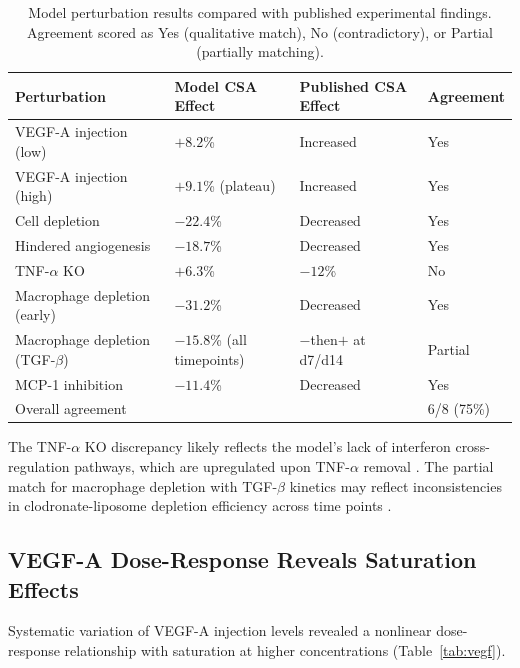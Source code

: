 \documentclass[11pt]{article}
\begin{document}
\begin{table}[H]
\centering
\caption{Model perturbation results compared with published experimental findings. Agreement scored as Yes (qualitative match), No (contradictory), or Partial (partially matching).}
\label{tab:perturbations}
\begin{tabular}{llll}
\toprule
\textbf{Perturbation} & \textbf{Model CSA Effect} & \textbf{Published CSA Effect} & \textbf{Agreement} \\
\midrule
VEGF-A injection (low) & $+8.2$\% & Increased & Yes \\
VEGF-A injection (high) & $+9.1$\% (plateau) & Increased & Yes \\
Cell depletion & $-22.4$\% & Decreased & Yes \\
Hindered angiogenesis & $-18.7$\% & Decreased & Yes \\
TNF-$\alpha$ KO & $+6.3$\% & $-12$\% & No \\
Macrophage depletion (early) & $-31.2$\% & Decreased & Yes \\
Macrophage depletion (TGF-$\beta$) & $-15.8$\% (all timepoints) & $-$then$+$ at d7/d14 & Partial \\
MCP-1 inhibition & $-11.4$\% & Decreased & Yes \\
\midrule
\multicolumn{3}{l}{Overall agreement} & 6/8 (75\%) \\
\bottomrule
\end{tabular}
\end{table}

The TNF-$\alpha$ KO discrepancy likely reflects the model's lack of interferon cross-regulation pathways, which are upregulated upon TNF-$\alpha$ removal \citep{li2001tnf}. The partial match for macrophage depletion with TGF-$\beta$ kinetics may reflect inconsistencies in clodronate-liposome depletion efficiency across time points \citep{summan2006macrophages}.

\subsection{VEGF-A Dose-Response Reveals Saturation Effects}

Systematic variation of VEGF-A injection levels revealed a nonlinear dose-response relationship with saturation at higher concentrations (Table~\ref{tab:vegf}).
\end{document}
